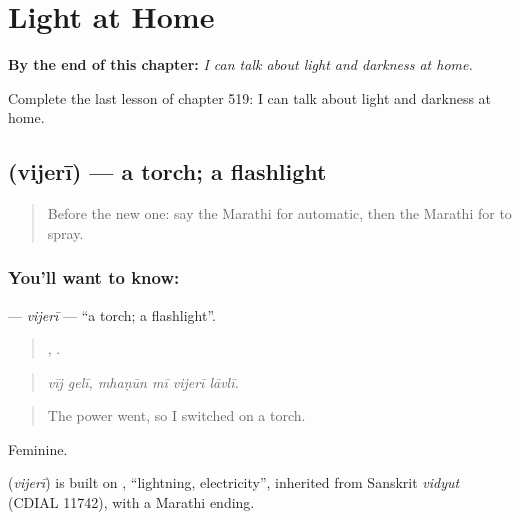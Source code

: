 
\chapter{Light at Home}
\label{ch:mr-light-at-home}

\begin{chapteropening}
\textbf{By the end of this chapter:} \emph{I can talk about light and darkness at home.}

Complete the last lesson of chapter 519: I can talk about light and darkness at home.
\end{chapteropening}

\section[\texorpdfstring{\mr{विजेरी} (vijerī)}{विजेरी (vijerī)}]{ (vijerī) — a torch; a flashlight}

\label{lesson:MR-C519-vijeri}



\begin{quote}
Before the new one: say the Marathi for automatic, then the Marathi for to spray.
\end{quote}

\subsection*{You'll want to know: }
\textbf{} — \emph{vijerī} — \textquotedblleft{}a torch; a flashlight\textquotedblright{}.

\begin{quote}
 ,    .
\end{quote}

\begin{quote}
\emph{vīj gelī, mhaṇūn mī vijerī lāvlī.}
\end{quote}

\begin{quote}
The power went, so I switched on a torch.
\end{quote}

Feminine.

\begin{cousinweb}
\textbf{} (\emph{vijerī}) is built on , \textquotedblleft{}lightning, electricity\textquotedblright{}, inherited from Sanskrit \emph{vidyut} (CDIAL 11742), with a Marathi ending.
\end{cousinweb}

